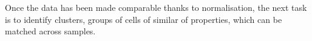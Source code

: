 
Once the data has been made comparable thanks to normalisation, the next task is to identify clusters, groups of cells of similar of properties,
which can be matched across samples.


%

